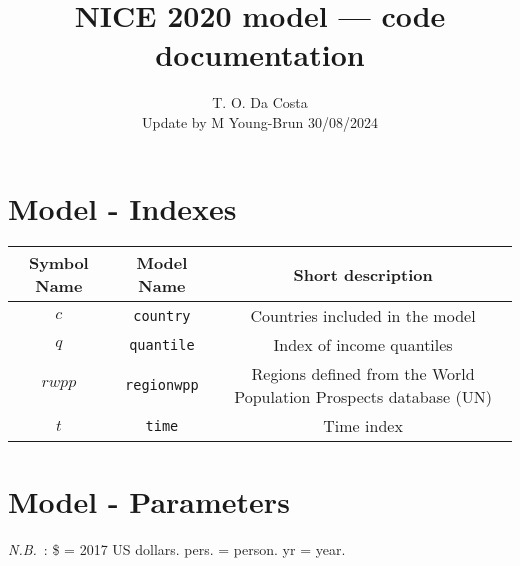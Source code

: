 \documentclass[
]{article}
\author{T. O. Da Costa \\{\small  Update by M Young-Brun 30/08/2024} }
\date{}
\title{NICE 2020 model --- code documentation}
\begin{document}
\maketitle
\tableofcontents

\newpage

\section{Model - Indexes}

\renewcommand{\arraystretch}{1.5}
\begin{longtable}{|c|c|c|}
  \hline
  \textbf{Symbol Name} & \textbf{Model Name} & \textbf{Short description} \\
  \hline
  \endhead
  $c$ & \texttt{country} & Countries included in the model \\

  $q$ & \texttt{quantile} & Index of income quantiles \\
  
  
  $rwpp$ &\texttt{regionwpp} & Regions defined from the World Population Prospects database (UN) \\
  
  $t$ & \texttt{time} & Time index \\

  \hline
\end{longtable}



\section{Model - Parameters}

\textit{N.B.} : \$ = 2017 US dollars. pers. = person. yr = year.
\end{document}
